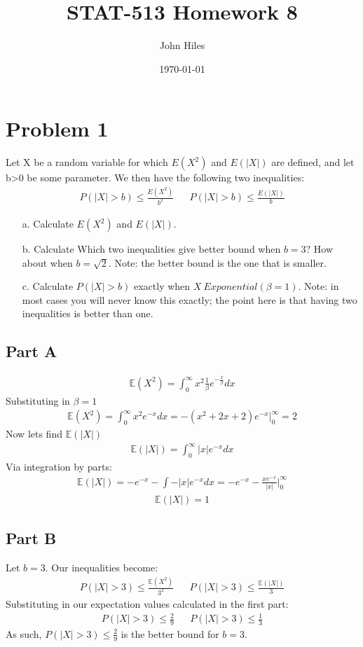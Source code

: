 \documentclass{article}
\title{STAT-513 Homework 8}
\author{John Hiles}
\date\today
\begin{document}
\maketitle %


\section*{Problem 1}
Let X be a random variable for which $E(X^2)$ and $E(|X|)$ are defined, and let b>0 be some parameter. We then have the following two inequalities:
\begin{align*}
P(|X|>b) \leq \frac{E(X^2)}{b^2} && P(|X|>b) \leq \frac{E(|X|)}{b}
\end{align*}

\begin{enumerate}
\item[a.] Calculate $E(X^2)$ and $E(|X|)$.
\item[b.] Calculate Which two inequalities give better bound when $b=3$? How about when $b=\sqrt{2}$. Note: the better bound is the one that is smaller.
\item[c.] Calculate $P(|X| > b)$ exactly when $X ~ Exponential(\beta =1)$. Note: in most cases you will never know
this exactly; the point here is that having two inequalities is better than one.
\end{enumerate}
\subsection*{Part A}
\begin{align*}
\mathbb{E}(X^2) = \int_{0}^{\infty} x^2 \frac{1}{\beta} e^{-\frac{x}{\beta}} dx
\end{align*}
Substituting in $\beta=1$
\begin{align*}
\mathbb{E}(X^2) = \int_{0}^{\infty} x^2 e^{-x} dx = -(x^2+2x+2) e^{-x}|_{0}^{\infty} = 2
\end{align*}
Now lets find $\mathbb{E}(|X|)$
\begin{align*}
\mathbb{E}(|X|) = \int_{0}^{\infty} |x| e^{-x} dx
\end{align*}
Via integration by parts:
\begin{align*}
\mathbb{E}(|X|) = -e^{-x} - \int - |x| e^{-x} dx = -e^{-x} - \frac{xe^{-x}}{|x|} |_{0}^{\infty}
\end{align*}
\begin{align*}
\mathbb{E}(|X|) = 1
\end{align*}
\subsection*{Part B}
Let $b=3$. Our inequalities become:
\begin{align*}
P(|X|>3) \leq \frac{\mathbb{E}(X^2)}{3^2} && P(|X|>3) \leq \frac{\mathbb{E}(|X|)}{3}
\end{align*}
Substituting in our expectation values calculated in the first part:
\begin{align*}
P(|X|>3) \leq \frac{2}{9} && P(|X|>3) \leq \frac{1}{3}
\end{align*}
As such, $\boxed{ P(|X|>3) \leq \frac{2}{9} }$ is the better bound for $b=3$.
\end{document}
